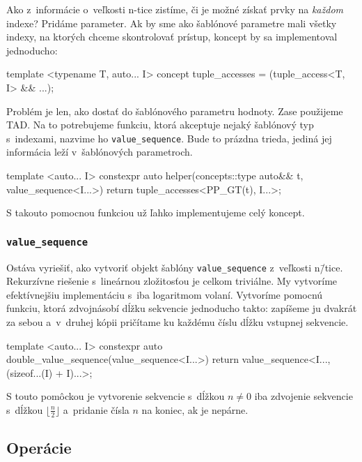 Ako z~informácie o~veľkosti n-tice zistíme, či je možné získať prvky na \emph{každom} indexe? Pridáme parameter. Ak by sme ako šablónové parametre mali všetky indexy, na ktorých chceme skontrolovať prístup, koncept by sa implementoval jednoducho:
\begin{code}
template <typename T, auto... I>
concept tuple_accesses = (tuple_access<T, I> && ...);
\end{code}
Problém je len, ako dostať do šablónového parametru hodnoty. Zase použijeme TAD. Na to potrebujeme funkciu, ktorá akceptuje nejaký šablónový typ s~indexami, nazvime ho \texttt{value\_sequence}. Bude to prázdna trieda, jediná jej informácia leží v~šablónových parametroch.
\begin{code}
template <auto... I>
constexpr auto helper(concepts::type auto&& t, value_sequence<I...>)
{ return tuple_accesses<PP_GT(t), I...>; }
\end{code}
S takouto pomocnou funkciou už ľahko implementujeme celý koncept.

\subsubsection{\texttt{value\_sequence}}

Ostáva vyriešiť, ako vytvoriť objekt šablóny \texttt{value\_sequence} z~veľkosti n\=/tice. Rekurzívne riešenie s~lineárnou zložitosťou je celkom triviálne. My vytvoríme efektívnejšiu implementáciu s~iba logaritmom volaní. Vytvoríme pomocnú funk\-ciu, ktorá zdvojnásobí dĺžku sekvencie jednoducho takto: zapíšeme ju dvakrát za sebou a~v~druhej kópii pričítame ku každému číslu dĺžku vstupnej sekvencie.
\begin{code}
template <auto... I>
constexpr auto double_value_sequence(value_sequence<I...>)
{ return value_sequence<I..., (sizeof...(I) + I)...>{}; }
\end{code}
S touto pomôckou je vytvorenie sekvencie s~dĺžkou $n\neq0$ iba zdvojenie sekvencie s~dĺžkou $\lfloor\frac{n}{2}\rfloor$ a~pridanie čísla $n$ na koniec, ak je nepárne.

\subsection{Operácie}

